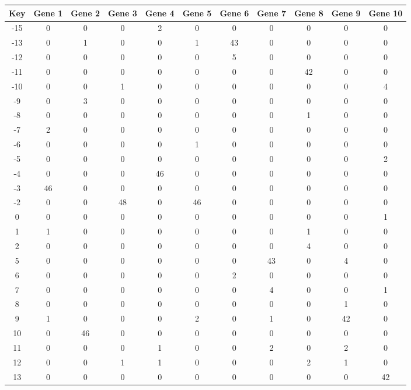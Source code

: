 \begin{tabular}{|c|c|c|c|c|c|c|c|c|c|c|}
\hline
Key & Gene 1 & Gene 2 & Gene 3 & Gene 4 & Gene 5 & Gene 6 & Gene 7 & Gene 8 & Gene 9 & Gene 10 \\
\hline
-15 & 0 & 0 & 0 & 2 & 0 & 0 & 0 & 0 & 0 & 0 \\
-13 & 0 & 1 & 0 & 0 & 1 & 43 & 0 & 0 & 0 & 0 \\
-12 & 0 & 0 & 0 & 0 & 0 & 5 & 0 & 0 & 0 & 0 \\
-11 & 0 & 0 & 0 & 0 & 0 & 0 & 0 & 42 & 0 & 0 \\
-10 & 0 & 0 & 1 & 0 & 0 & 0 & 0 & 0 & 0 & 4 \\
-9 & 0 & 3 & 0 & 0 & 0 & 0 & 0 & 0 & 0 & 0 \\
-8 & 0 & 0 & 0 & 0 & 0 & 0 & 0 & 1 & 0 & 0 \\
-7 & 2 & 0 & 0 & 0 & 0 & 0 & 0 & 0 & 0 & 0 \\
-6 & 0 & 0 & 0 & 0 & 1 & 0 & 0 & 0 & 0 & 0 \\
-5 & 0 & 0 & 0 & 0 & 0 & 0 & 0 & 0 & 0 & 2 \\
-4 & 0 & 0 & 0 & 46 & 0 & 0 & 0 & 0 & 0 & 0 \\
-3 & 46 & 0 & 0 & 0 & 0 & 0 & 0 & 0 & 0 & 0 \\
-2 & 0 & 0 & 48 & 0 & 46 & 0 & 0 & 0 & 0 & 0 \\
0 & 0 & 0 & 0 & 0 & 0 & 0 & 0 & 0 & 0 & 1 \\
1 & 1 & 0 & 0 & 0 & 0 & 0 & 0 & 1 & 0 & 0 \\
2 & 0 & 0 & 0 & 0 & 0 & 0 & 0 & 4 & 0 & 0 \\
5 & 0 & 0 & 0 & 0 & 0 & 0 & 43 & 0 & 4 & 0 \\
6 & 0 & 0 & 0 & 0 & 0 & 2 & 0 & 0 & 0 & 0 \\
7 & 0 & 0 & 0 & 0 & 0 & 0 & 4 & 0 & 0 & 1 \\
8 & 0 & 0 & 0 & 0 & 0 & 0 & 0 & 0 & 1 & 0 \\
9 & 1 & 0 & 0 & 0 & 2 & 0 & 1 & 0 & 42 & 0 \\
10 & 0 & 46 & 0 & 0 & 0 & 0 & 0 & 0 & 0 & 0 \\
11 & 0 & 0 & 0 & 1 & 0 & 0 & 2 & 0 & 2 & 0 \\
12 & 0 & 0 & 1 & 1 & 0 & 0 & 0 & 2 & 1 & 0 \\
13 & 0 & 0 & 0 & 0 & 0 & 0 & 0 & 0 & 0 & 42 \\
\hline
\end{tabular}